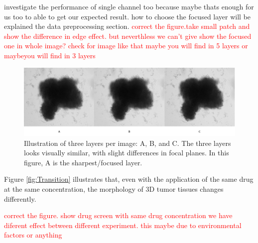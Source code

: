  
  investigate the performance of single channel too because maybe thats enough for us too to able to get our expected result.
  how to choose the focused layer will be explained the data preprocessing section.
  \textcolor{red}{correct the figure.take small patch and show the difference in edge effect. but neverthless we can't 
  give show the focused one in whole image? check for image like that maybe you will find in 5 layers or maybeyou will find in 3 layers}
\begin{figure}[H]
  \centering
  \includegraphics[scale=0.46]{figures/threes.png} 
  \caption{Illustration of three layers per image: A, B, and C. The three layers looks visually similar, with slight differences in focal planes. In this figure, A is the sharpest/focused layer.}
  \label{fig:Threes}
\end{figure}

Figure \ref{fig:Transition} illustrates that, even with the application of the same drug at the same concentration, the morphology of 3D tumor tissues changes differently.

\textcolor{red}{correct the figure. show drug screen with same drug concentration we have diferent effect between different experiment. this maybe due to environmental 
factors or anything}

